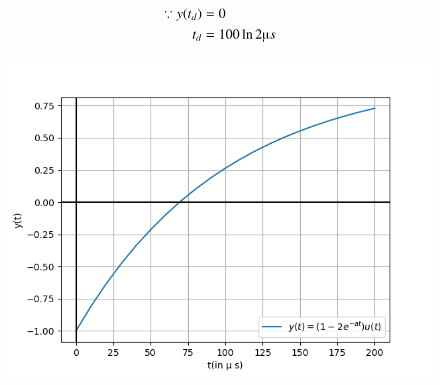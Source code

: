 \documentclass[journal,12pt,twocolumn]{IEEEtran}
\theoremstyle{remark}
\begin{document}
\begin{align}
    \because y(t_d) &= 0 \\
    t_d &= 100 \ln{2} \micro s 
\end{align}
\begin{figure}[!h]
    \centering
    \includegraphics[width=\columnwidth]{figs/graph.png}
\end{figure}
\end{document}
